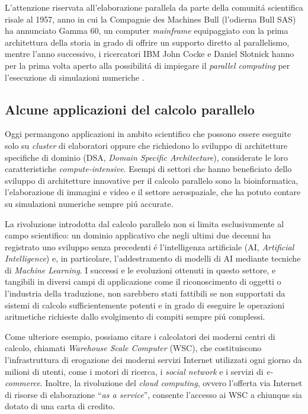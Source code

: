 L'attenzione riservata all'elaborazione parallela da parte della comunit\'a
scientifica risale al 1957, anno in cui la
Compagnie des Machines Bull (l'odierna Bull SAS) ha annunciato Gamma 60, un computer \textit{mainframe}
equipaggiato con la prima architettura della storia in grado di offrire un supporto diretto
al parallelismo, mentre l'anno successivo, i ricercatori IBM John
Cocke e Daniel Slotnick hanno per la prima volta aperto alla
possibilit\'a di impiegare il \textit{parallel computing} per
l'esecuzione di simulazioni numeriche \cite{Wilson1994}.

\subsection{Alcune applicazioni del calcolo parallelo}
Oggi permangono applicazioni in ambito scientifico
che possono essere eseguite
solo su \textit{cluster} di elaboratori oppure che richiedono lo sviluppo di architetture specifiche di dominio (DSA, \textit{Domain Specific Architecture}), considerate le loro caratteristiche \textit{compute-intensive}.\newline
Esempi di settori che hanno beneficiato dello sviluppo di
architetture innovative per il calcolo parallelo sono la
bioinformatica, l'elaborazione di immagini e video
e il settore aerospaziale, che ha potuto contare su simulazioni
numeriche sempre pi\'u accurate.

La rivoluzione introdotta dal calcolo parallelo non si limita esclusivamente al campo scientifico: un dominio applicativo che negli ultimi due decenni ha registrato uno sviluppo senza precedenti \'e l'intelligenza artificiale (AI, \textit{Artificial Intelligence}) e, in particolare, l'addestramento di modelli di AI mediante tecniche di \textit{Machine Learning}. \newline
I successi e le evoluzioni ottenuti in questo settore, e tangibili in diversi campi di applicazione come il riconoscimento di oggetti o l'industria della traduzione, non sarebbero stati fattibili se non supportati da sistemi di calcolo sufficientemente potenti e in grado di eseguire le operazioni aritmetiche richieste dallo svolgimento di compiti sempre pi\'u complessi.

Come ulteriore esempio, possiamo citare i calcolatori dei moderni centri di calcolo, chiamati \textit{Warehouse Scale Computer} (WSC), che costituiscono l'infrastruttura di erogazione dei moderni servizi Internet utilizzati ogni giorno da milioni di utenti, come i motori di ricerca, i \textit{social network} e i servizi di \textit{e-commerce}.\newline
Inoltre, la rivoluzione del \textit{cloud computing}, ovvero l'offerta via Internet di risorse di elaborazione \enquote{\textit{as a service}}, consente l'accesso ai WSC a chiunque sia dotato di una carta di credito.
